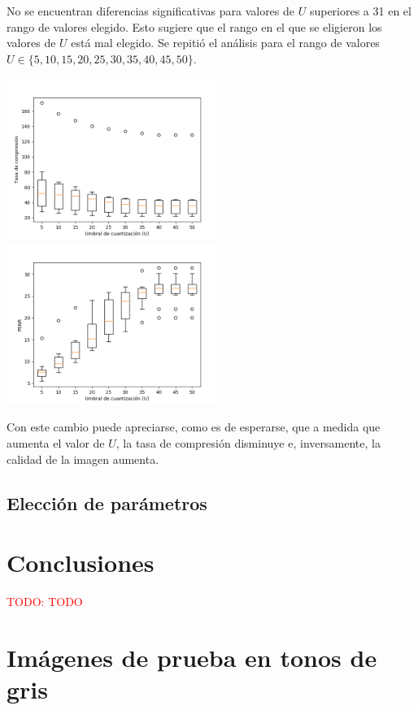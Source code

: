 \documentclass{article}
\newcommand{\set}[1]{\{#1\}}
\newcommand{\TODO}[1]{\textcolor{red}{TODO: #1}}
\begin{document}
No se encuentran diferencias significativas para valores de $U$
superiores a 31 en el rango de valores elegido.
Esto sugiere que el rango en el que se eligieron los valores de $U$
está mal elegido.
Se repitió el análisis para el rango de valores
$U \in \set{5, 10, 15, 20, 25, 30, 35, 40, 45, 50}$.
\begin{center}
\includegraphics[width=7cm]{../imgs/output/gray_plots/ualt_rate.png}
\includegraphics[width=7cm]{../imgs/output/gray_plots/ualt_psnr.png}
\end{center}
Con este cambio puede apreciarse, como es de esperarse, que
a medida que aumenta el valor de $U$,
la tasa de compresión disminuye e, inversamente, la calidad de
la imagen aumenta.

\subsection{Elección de parámetros}


\section{Conclusiones}

\TODO{TODO}

\newpage
\appendix
\section{Imágenes de prueba en tonos de gris}
\end{document}
